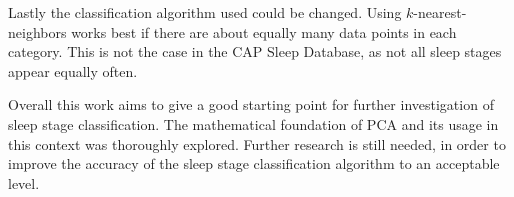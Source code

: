 \newpage
Lastly the classification algorithm used could be changed. Using $k$-nearest-neighbors works best if there are about equally many data points in each category. This is not the case in the CAP Sleep Database, as not all sleep stages appear equally often.

Overall this work aims to give a good starting point for further investigation of sleep stage classification. The mathematical foundation of PCA and its usage in this context was thoroughly explored. Further research is still needed, in order to improve the accuracy of the sleep stage classification algorithm to an acceptable level.